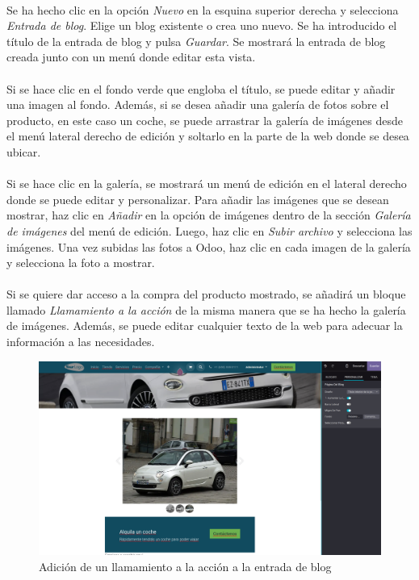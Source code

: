 \paragraph{}
Se ha hecho clic en la opción \textit{Nuevo} en la esquina superior derecha y selecciona \textit{Entrada de blog}. Elige un blog existente o crea uno nuevo. Se ha introducido el título de la entrada de blog y pulsa \textit{Guardar}. Se mostrará la entrada de blog creada junto con un menú donde editar esta vista.
\paragraph{}
Si se hace clic en el fondo verde que engloba el título, se puede editar y añadir una imagen al fondo. Además, si se desea añadir una galería de fotos sobre el producto, en este caso un coche, se puede arrastrar la galería de imágenes desde el menú lateral derecho de edición y soltarlo en la parte de la web donde se desea ubicar.
\paragraph{}
Si se hace clic en la galería, se mostrará un menú de edición en el lateral derecho donde se puede editar y personalizar. Para añadir las imágenes que se desean mostrar, haz clic en \textit{Añadir} en la opción de imágenes dentro de la sección \textit{Galería de imágenes} del menú de edición. Luego, haz clic en \textit{Subir archivo} y selecciona las imágenes. Una vez subidas las fotos a Odoo, haz clic en cada imagen de la galería y selecciona la foto a mostrar.
\paragraph{}
Si se quiere dar acceso a la compra del producto mostrado, se añadirá un bloque llamado \textit{Llamamiento a la acción} de la misma manera que se ha hecho la galería de imágenes. Además, se puede editar cualquier texto de la web para adecuar la información a las necesidades.

\begin{figure}[h]
    \centering
    \includegraphics[width=1\linewidth]{instalacion/callToAction.png}
    \caption{Adición de un llamamiento a la acción a la entrada de blog}
    \label{fig:callToAction}
\end{figure}
